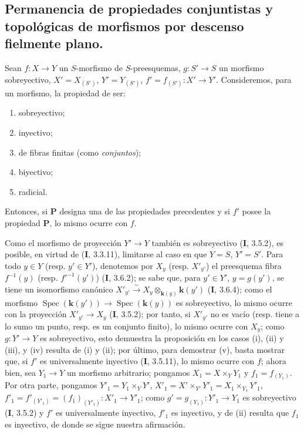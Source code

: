 \subsection{Permanencia de propiedades conjuntistas y topológicas de morfismos
por descenso fielmente plano.}
\label{subsection:IV.2.6-fr}

\begin{proposition}[2.6.1]
Sean $f:X\to Y$ un $S$-morfismo de $S$-preesquemas, $g:S'\to S$ un
morfismo sobreyectivo, $X'=X_{(S')}$, $Y'=Y_{(S')}$,
$f'=f_{(S')}:X'\to Y'$. Consideremos, para un morfismo, la propiedad de ser:
\begin{enumerate}
\item[\textup{(i)}] sobreyectivo;
\item[\textup{(ii)}] inyectivo;
\item[\textup{(iii)}] de fibras finitas \textup{(como \emph{conjuntos})};
\item[\textup{(iv)}] biyectivo;
\item[\textup{(v)}] radicial.
\end{enumerate}
Entonces, si $\boldsymbol{P}$ designa una de las propiedades precedentes y si $f'$ posee la
propiedad $\boldsymbol{P}$, lo mismo ocurre con $f$.
\end{proposition}

Como el morfismo de proyección $Y'\to Y$ también es sobreyectivo (\textbf I, 3.5.2),
es posible, en virtud de (\textbf I, 3.3.11), limitarse al caso en que $Y=S$,
$Y'=S'$. Para todo $y\in Y$ (resp. $y'\in Y'$), denotemos por $X_y$ (resp.
$X'_{y'}$) el preesquema fibra $f^{-1}(y)$ (resp. $f'^{-1}(y')$) (\textbf I, 3.6.2);
se sabe que, para $y'\in Y'$, $y=g(y')$, se tiene un isomorfismo canónico $X'_{y'}\xrightarrow{\sim}X_y\otimes_{\mathbf{k}(y)}\boldsymbol{k}(y')$ (\textbf{I}, 3.6.4);
como el morfismo $\operatorname{Spec}(\boldsymbol{k}(y'))\to\operatorname{Spec}(\boldsymbol{k}(y))$
es sobreyectivo, lo mismo ocurre con la proyección $X'_{y'}\to X_y$
(\textbf I, 3.5.2); por tanto, si $X'_{y'}$ no es vacío (resp. tiene a lo sumo un
punto, resp. es un conjunto finito), lo mismo ocurre con $X_y$; como
$g:Y'\to Y$ es sobreyectivo, esto demuestra la proposición en los casos (i),
(ii) y (iii), y (iv) resulta de (i) y (ii); por último, para demostrar (v),
basta mostrar que, si $f'$ es universalmente inyectivo (\textbf I, 3.5.11), lo mismo
ocurre con $f$; ahora bien, sea $Y_1\to Y$ un morfismo arbitrario; pongamos
$X_1=X\times_Y Y_1$ y $f_1=f_{(Y_1)}$. Por otra parte, pongamos $Y'_1=Y_1\times_Y Y'$, $X'_1=X'\times_{Y'}Y'_1=X_1\times_{Y_1}Y'_1$, $f'_1=f'_{(Y'_1)}=(f_1)_{(Y'_1)}:X'_1\to Y'_1$;
como $g'=g_{(Y_1)}:Y'_1\to Y_1$ es sobreyectivo (\textbf I, 3.5.2) y $f'$ es
universalmente inyectivo, $f'_1$ es inyectivo, y de (ii) resulta que
$f_1$ es inyectivo, de donde se sigue nuestra afirmación.

